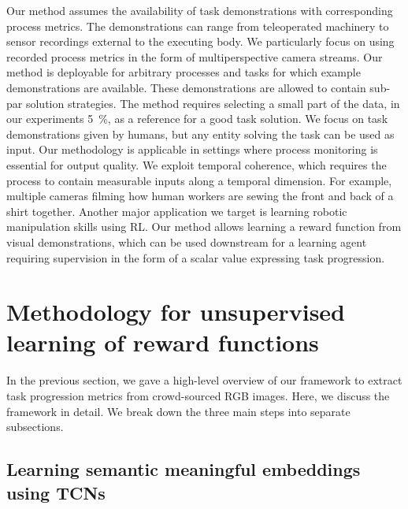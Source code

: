 \documentclass[\home/main.tex]{subfiles}
\begin{document}
Our method assumes the availability of task demonstrations with corresponding process metrics. The demonstrations can range from teleoperated machinery to sensor recordings external to the executing body. We particularly focus on using recorded process metrics in the form of multiperspective camera streams. Our method is deployable for arbitrary processes and tasks for which example demonstrations are available. These demonstrations are allowed to contain sub-par solution strategies. The method requires selecting a small part of the data, in our experiments \qty{5}{\percent}, as a reference for a good task solution. We focus on task demonstrations given by humans, but any entity solving the task can be used as input. Our methodology is applicable in settings where process monitoring is essential for output quality. We exploit temporal coherence, which requires the process to contain measurable inputs along a temporal dimension.
For example, multiple cameras filming how human workers are sewing the front and back of a shirt together.
Another major application we target is learning robotic manipulation skills using RL. Our method allows learning a reward function from visual demonstrations, which can be used downstream for a learning agent requiring supervision in the form of a scalar value expressing task progression.


\section{Methodology for unsupervised learning of reward functions}\label{sec:rewards_methodology}
In the previous section, we gave a high-level overview of our framework to extract task progression metrics from crowd-sourced RGB images. Here, we discuss the framework in detail. We break down the three main steps into separate subsections.

\subsection{Learning semantic meaningful embeddings using TCNs}\label{subsec:rewards_tcn}
\end{document}
